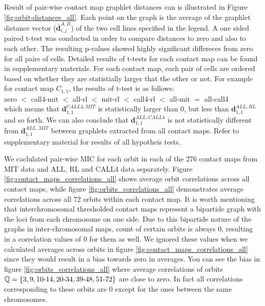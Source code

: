 \documentclass[a4,center,fleqn]{NAR}
\begin{document}
Result of pair-wise contact map graphlet distances can is
illustrated in Figure \ref{fig:orbit-distances_all}.
Each point on the graph is the
average of the graphlet distance vector 
($\bar{\mathbf{d}}^{\scriptscriptstyle A,B}_{i,j}$)
of the two cell lines specified in the legend.
 A one sided paired t-test
was conducted in order to compare distances to
zero and also to each other. 
The resulting p-values showed highly 
significant differeces from zero for all pairs of
cells. Detailed results of t-tests for each
contact map can be found in supplementary materials.
For each contact map, each pair of cells are
ordered based on whether they are statistially
larger that the other or not. For example
for contact map $C_{1,1}$, the results 
of t-test is as follows:
\vspace{.2cm}\\
\small{
zero  $<$  call4-mit  $<$     all-rl  $<$     mit-rl  $<$   call4-rl  $<$    all-mit  $=$  all-call4
}
\vspace{.2cm}\\
which means that 
$\mathbf{d}^{\scriptscriptstyle CALL4, MIT}_{1,1}$ 
is statistically larger than 0,
but less than $\mathbf{d}^{\scriptscriptstyle ALL, RL}_{1,1}$ 
and so forth. We can also conclude that 
$\mathbf{d}^{\scriptscriptstyle ALL, CALL4}_{1,1}$ is not
statistically different from 
$\mathbf{d}^{\scriptscriptstyle ALL, MIT}_{1,1}$
between graphlets extracted from all contact maps. 
Refer to supplementary
material for results of all hypotheis tests.

We caclulated pair-wise MIC for each orbit in each of the 276
contact maps from MIT data and ALL, RL and CALL4 data separately. 
Figure \ref{fig:contact_maps_correlations_all}
shows average orbit correlations across all contact maps, while
figure \ref{fig:orbits_correlations_all} 
demonstrates average correlations across all 72 orbits within each  contact map.
It is worth mentioning that interchromosomal thresholded contact maps 
represent
a bipartide graph with the loci from each chromosome on one side. Due to this
bipartide nature of the graphs in inter-chromosomal maps,
count of certain orbits is always 0, resulting in
a correlation values of 0 for them as well.
We ignored these values  when we calculated averages across orbits 
in figure \ref{fig:contact_maps_correlations_all} since they
would result in a bias towards zero in averages. You can see the bias in 
figure \ref{fig:orbits_correlations_all} where average correlations of orbits
$\mathbb{Q} = \{3, 9, 10{\text -}14, 20{\text -}34, 39{\text -}48, 51{\text -}72\}$ 
are close to zero. In fact all correlations
corresponding to these orbits are 0 except for the ones between the same 
chromosomes.
\end{document}
